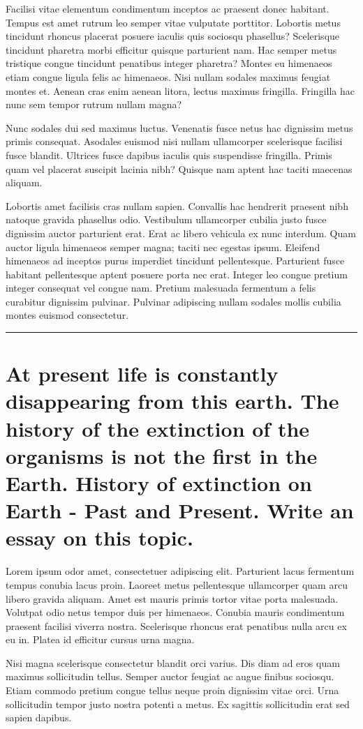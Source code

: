 \documentclass[12pt]{article}
\begin{document}
Facilisi vitae elementum condimentum inceptos ac praesent donec habitant. Tempus est amet rutrum leo semper vitae vulputate porttitor. Lobortis metus tincidunt rhoncus placerat posuere iaculis quis sociosqu phasellus? Scelerisque tincidunt pharetra morbi efficitur quisque parturient nam. Hac semper metus tristique congue tincidunt penatibus integer pharetra? Montes eu himenaeos etiam congue ligula felis ac himenaeos. Nisi nullam sodales maximus feugiat montes et. Aenean cras enim aenean litora, lectus maximus fringilla. Fringilla hac nunc sem tempor rutrum nullam magna?

Nunc sodales dui sed maximus luctus. Venenatis fusce netus hac dignissim metus primis consequat. Asodales euismod nisi nullam ullamcorper scelerisque facilisi fusce blandit. Ultrices fusce dapibus iaculis quis suspendisse fringilla. Primis quam vel placerat suscipit lacinia nibh? Quisque nam aptent hac taciti maecenas aliquam.

Lobortis amet facilisis cras nullam sapien. Convallis hac hendrerit praesent nibh natoque gravida phasellus odio. Vestibulum ullamcorper cubilia justo fusce dignissim auctor parturient erat. Erat ac libero vehicula ex nunc interdum. Quam auctor ligula himenaeos semper magna; taciti nec egestas ipsum. Eleifend himenaeos ad inceptos purus imperdiet tincidunt pellentesque. Parturient fusce habitant pellentesque aptent posuere porta nec erat. Integer leo congue pretium integer consequat vel congue nam. Pretium malesuada fermentum a felis curabitur dignissim pulvinar. Pulvinar adipiscing nullam sodales mollis cubilia montes euismod consectetur.
\vfill
\rule{\textwidth}{0.4pt}
\newpage

\section{At present life is constantly disappearing from this earth. The history of the extinction of the organisms is not the first in the Earth. History of extinction on Earth - Past and Present. Write an essay on this topic.}
Lorem ipsum odor amet, consectetuer adipiscing elit. Parturient lacus fermentum tempus conubia lacus proin. Laoreet metus pellentesque ullamcorper quam arcu libero gravida aliquam. Amet est mauris primis tortor vitae porta malesuada. Volutpat odio netus tempor duis per himenaeos. Conubia mauris condimentum praesent facilisi viverra nostra. Scelerisque rhoncus erat penatibus nulla arcu ex eu in. Platea id efficitur cursus urna magna.

Nisi magna scelerisque consectetur blandit orci varius. Dis diam ad eros quam maximus sollicitudin tellus. Semper auctor feugiat ac augue finibus sociosqu. Etiam commodo pretium congue tellus neque proin dignissim vitae orci. Urna sollicitudin tempor justo nostra potenti a metus. Ex sagittis sollicitudin erat sed sapien dapibus.
\end{document}
